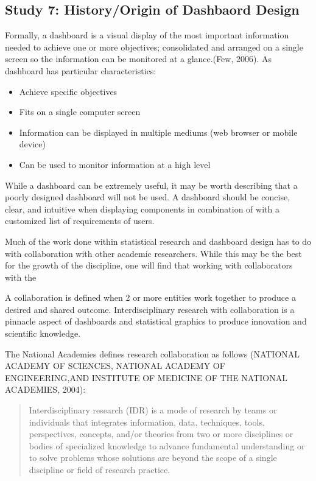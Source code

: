 \documentclass[print]{nuthesis}
\providecommand{\tightlist}{%
  \setlength{\itemsep}{0pt}\setlength{\parskip}{0pt}}
\begin{document}
\hypertarget{study-7-historyorigin-of-dashbaord-design}{%
\subsection{Study 7: History/Origin of Dashbaord Design}\label{study-7-historyorigin-of-dashbaord-design}}

Formally, a dashboard is a visual display of the most important information needed to achieve one or more objectives; consolidated and arranged on a single screen so the information can be monitored at a glance.(Few, 2006). As dashboard has particular characteristics:

\begin{itemize}
\tightlist
\item
  Achieve specific objectives
\item
  Fits on a single computer screen
\item
  Information can be displayed in multiple mediums (web browser or mobile device)
\item
  Can be used to monitor information at a high level
\end{itemize}

While a dashboard can be extremely useful, it may be worth describing that a poorly designed dashboard will not be used. A dashboard should be concise, clear, and intuitive when displaying components in combination of with a customized list of requirements of users.

Much of the work done within statistical research and dashboard design has to do with collaboration with other academic researchers. While this may be the best for the growth of the discipline, one will find that working with collaborators with the

A collaboration is defined when 2 or more entities work together to produce a desired and shared outcome. Interdisciplinary research with collaboration is a pinnacle aspect of dashboards and statistical graphics to produce innovation and scientific knowledge.

The National Academies defines research collaboration as follows (NATIONAL ACADEMY OF SCIENCES, NATIONAL ACADEMY OF ENGINEERING,AND INSTITUTE OF MEDICINE OF THE NATIONAL ACADEMIES, 2004):

\begin{quote}
Interdisciplinary research (IDR) is a mode of research by teams or individuals that integrates information, data, techniques, tools, perspectives, concepts, and/or theories from two or more disciplines or bodies of specialized knowledge to advance fundamental understanding or to solve problems whose solutions are beyond the scope of a single discipline or field of research practice.
\end{quote}
\end{document}
